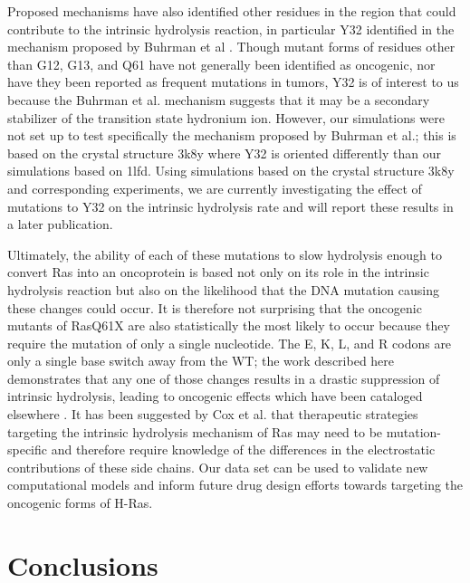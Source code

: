 Proposed mechanisms have also identified other residues in the region that could contribute to the intrinsic hydrolysis reaction, in particular Y32 identified in the mechanism proposed by Buhrman et al \cite{Buhrman2010}. 
Though mutant forms of residues other than G12, G13, and Q61 have not generally been identified as oncogenic, nor have they been reported as frequent mutations in tumors, Y32 is of interest to us because the Buhrman et al. mechanism suggests that it may be a secondary stabilizer of the transition state hydronium ion. 
However, our simulations were not set up to test specifically the mechanism proposed by Buhrman et al.; this is based on the crystal structure 3k8y where Y32 is oriented differently than our simulations based on 1lfd. 
Using simulations based on the crystal structure 3k8y and corresponding experiments, we are currently investigating the effect of mutations to Y32 on the intrinsic hydrolysis rate and will report these results in a later publication. 

Ultimately, the ability of each of these mutations to slow hydrolysis enough to convert Ras into an oncoprotein is based not only on its role in the intrinsic hydrolysis reaction but also on the likelihood that the DNA mutation causing these changes could occur. 
It is therefore not surprising that the oncogenic mutants of RasQ61X are also statistically the most likely to occur because they require the mutation of only a single nucleotide. 
The E, K, L, and R codons are only a single base switch away from the WT; the work described here demonstrates that any one of those changes results in a drastic suppression of intrinsic hydrolysis, leading to oncogenic effects which have been cataloged elsewhere \cite{Prior2012, Hobbs2016}. 
It has been suggested by Cox et al. that therapeutic strategies targeting the intrinsic hydrolysis mechanism of Ras may need to be mutation-specific\cite{Cox2014} and therefore require knowledge of the differences in the electrostatic contributions of these side chains. 
Our data set can be used to validate new computational models and inform future drug design efforts towards targeting the oncogenic forms of H-Ras. 

\section{Conclusions}\label{ras-conclusion}


